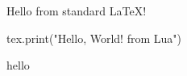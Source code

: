 \documentclass[a4paper,12pt]{article}
\begin{document}
Hello from standard \LaTeX{}!

\begin{luacode}
tex.print("Hello, World! from Lua")
\end{luacode}

	hello
\end{document}
